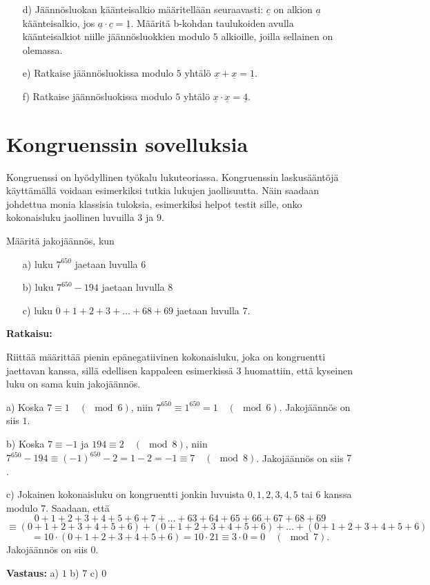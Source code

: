\begin{enumerate}
\begin{itemize}
\item[d)] Jäännösluokan käänteisalkio määritellään seuraavasti: $\underline{c}$ on alkion $\underline{a}$ käänteisalkio, jos $\underline{a} \cdot \underline{c} = \underline{1}$. Määritä b-kohdan taulukoiden avulla käänteisalkiot niille jäännösluokkien modulo $5$ alkioille, joilla sellainen on olemassa.
\item[e)] Ratkaise jäännösluokissa modulo $5$ yhtälö $\underline{x}+\underline{x}=\underline{1}$.
\item[f)] Ratkaise jäännösluokissa modulo $5$ yhtälö $\underline{x}\cdot \underline{x}=\underline{4}$.
\end{itemize}

\end{enumerate}

\newpage

\section{Kongruenssin sovelluksia}
Kongruenssi on hyödyllinen työkalu lukuteoriassa. Kongruenssin laskusääntöjä käyttämällä voidaan esimerkiksi tutkia lukujen jaollisuutta. Näin saadaan johdettua monia klassisia tuloksia, esimerkiksi helpot testit sille, onko kokonaisluku jaollinen luvuilla $3$ ja $9$.

\begin{esimerkki}
Määritä jakojäännös, kun
\begin{itemize}
\item[a)] luku $7^{650}$ jaetaan luvulla $6$
\item[b)] luku $7^{650} - 194$ jaetaan luvulla $8$
\item[c)] luku $0+1+2+3+ \ldots + 68 + 69$ jaetaan luvulla $7$.
\end{itemize}

{\bf Ratkaisu:}

Riittää määrittää pienin epänegatiivinen kokonaisluku, joka on kongruentti jaettavan kanssa, sillä edellisen kappaleen esimerkissä 3 huomattiin, että kyseinen luku on sama kuin jakojäännös.

a) Koska $7 \equiv 1 \quad(\mod 6)$, niin $7^{650} \equiv 1^{650} = 1 \quad (\mod 6)$. Jakojäännös on siis $1$.

b) Koska $7 \equiv -1$ ja $194 \equiv 2 \quad(\mod 8)$, niin $7^{650} - 194 \equiv (-1)^{650} - 2 = 1 - 2 = -1 \equiv 7 \quad(\mod 8)$. Jakojäännös on siis $7$.

c) Jokainen kokonaisluku on kongruentti jonkin luvuista $0,1,2,3,4,5$ tai $6$ kanssa modulo $7$. Saadaan, että
\[
0+1+2+3+4+5+6+7+ \ldots +63+64+65+66+67+68+69
\]
\[
 \equiv (0+1+2+3+4+5+6)+(0+1+2+3+4+5+6)+ \ldots +(0+1+2+3+4+5+6)
\]
\[
=10 \cdot (0+1+2+3+4+5+6) = 10\cdot 21 \equiv 3\cdot 0 = 0 \quad(\mod 7).
\]
Jakojäännös on siis $0$.

{\bf Vastaus:} a) $1$ b) $7$ c) $0$
\end{esimerkki}


